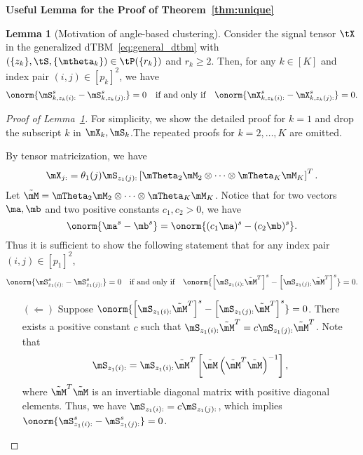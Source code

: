 \documentclass[lettersize,onecolumn,journal]{IEEEtran}
\theoremstyle{definition}
\newtheorem{lem}{Lemma}
\theoremstyle{definition}
\newcommand{\of}[1]{\left(#1\right)}
\newcommand{\off}[1]{\left[#1\right]}
\begin{document}
{\bf Useful Lemma for the Proof of Theorem~\ref{thm:unique}} 

\begin{lem}[Motivation of angle-based clustering]\label{lem:angle} Consider the signal tensor $\tX$ in the generalized dTBM~\eqref{eq:general_dtbm} with $(\{z_k\},\tS,\{\mtheta_k\})\in \tP(\{r_k\})$ and $r_k \geq 2$. Then, for any $k \in [K]$ and index pair $(i,j)\in[p_k]^2$, we have 
\begin{equation}
    \onorm{ \mS_{k,z_k(i):}^s -  \mS_{k,z_k(j):}^s } = 0 \quad \text{if and only if} \quad \onorm{  \mX_{k, z_k(i):}^s -  \mX_{k,z_k(j):}^s } = 0.
\end{equation}
\end{lem}

\begin{proof}[Proof of Lemma~\ref{lem:angle}] For simplicity, we show the detailed proof for $k = 1$ and drop the subscript $k$ in $\mX_k, \mS_k$.The repeated proofs for $k = 2, \ldots, K$ are omitted. 

By tensor matricization, we have
\begin{equation}
    \mX_{j:} = \theta_1(j) \mS_{z_1(j):} \off{\mTheta_2 \mM_2 \otimes \cdots \otimes \mTheta_K \mM_K}^T.
\end{equation}     
Let $\tilde \mM = \mTheta_2 \mM_2 \otimes \cdots \otimes \mTheta_K \mM_K$. Notice that for two vectors $\ma, \mb$ and two positive constants $c_1, c_2 >0$, we have
\begin{equation}
\onorm{\ma^s - \mb^s} = \onorm{(c_1 \ma)^s - (c_2\mb)^s}.
\end{equation}
Thus it is sufficient to show the following statement that for any index pair $(i,j)\in[p_1]^2$,
\begin{equation}
\onorm{ \mS_{z_1(i):}^s - \mS_{z_1(j):}^s} = 0 \quad \text{if and only if} \quad \onorm{ \off{\mS_{z_1(i):} \tilde \mM^T }^s - \off{\mS_{z_1(j):}\tilde \mM^T}^s} = 0.
\end{equation}
\begin{enumerate}
    \item[$(\Leftarrow)$] Suppose $\onorm{ \off{\mS_{z_1(i):} \tilde \mM^T }^s - \off{\mS_{z_1(j):}\tilde \mM^T}^s} = 0$. There exists a positive constant $c$ such that $\mS_{z_1(i):} \tilde \mM^T= c \mS_{z_1(j):} \tilde \mM^T$. Note that
\begin{equation}
    \mS_{z_1(i):} = \mS_{z_1(i):} \tilde \mM^T \off{ \tilde \mM \of{ \tilde \mM^T  \tilde \mM}^{-1}},
\end{equation}
where $ \tilde \mM^T  \tilde \mM$ is an invertiable diagonal matrix with positive diagonal elements. Thus, we have $ \mS_{z_1(i):} = c  \mS_{z_1(j):}$, which implies $ \onorm{  \mS_{z_1(i):}^s -  \mS_{z_1(j):}^s } = 0 $.


\end{enumerate}
\end{proof}
\end{document}
